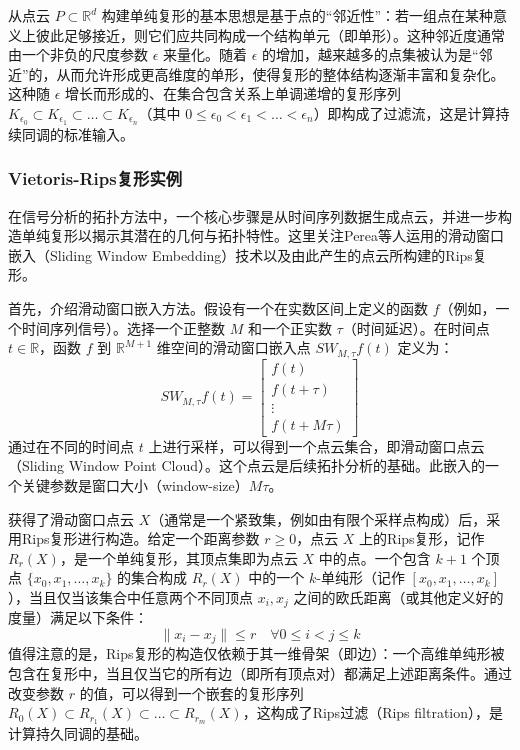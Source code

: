 从点云 $P \subset \mathbb{R}^d$ 构建单纯复形的基本思想是基于点的“邻近性”：若一组点在某种意义上彼此足够接近，则它们应共同构成一个结构单元（即单形）。这种邻近度通常由一个非负的尺度参数 $\epsilon$ 来量化。随着 $\epsilon$ 的增加，越来越多的点集被认为是“邻近”的，从而允许形成更高维度的单形，使得复形的整体结构逐渐丰富和复杂化。这种随 $\epsilon$ 增长而形成的、在集合包含关系上单调递增的复形序列 $K_{\epsilon_0} \subset K_{\epsilon_1} \subset \dots \subset K_{\epsilon_n}$（其中 $0 \le \epsilon_0 < \epsilon_1 < \dots < \epsilon_n$）即构成了过滤流，这是计算持续同调的标准输入。

\subsubsection{Vietoris-Rips复形实例}
在信号分析的拓扑方法中，一个核心步骤是从时间序列数据生成点云，并进一步构造单纯复形以揭示其潜在的几何与拓扑特性。这里关注Perea等人\cite{perea2015sliding}运用的滑动窗口嵌入（Sliding Window Embedding）技术以及由此产生的点云所构建的Rips复形。

首先，介绍滑动窗口嵌入方法。假设有一个在实数区间上定义的函数 $f$（例如，一个时间序列信号）。选择一个正整数 $M$ 和一个正实数 $\tau$（时间延迟）。在时间点 $t \in \mathbb{R}$，函数 $f$ 到 $\mathbb{R}^{M+1}$ 维空间的滑动窗口嵌入点 $SW_{M,\tau}f(t)$ 定义为：
\begin{equation}
    SW_{M,\tau}f(t) = \begin{bmatrix} f(t) \\ f(t+\tau) \\ \vdots \\ f(t+M\tau) \end{bmatrix}
\end{equation}
通过在不同的时间点 $t$ 上进行采样，可以得到一个点云集合，即滑动窗口点云（Sliding Window Point Cloud）。这个点云是后续拓扑分析的基础。此嵌入的一个关键参数是窗口大小（window-size）$M\tau$。

获得了滑动窗口点云 $X$（通常是一个紧致集，例如由有限个采样点构成）后，采用Rips复形进行构造。给定一个距离参数 $r \ge 0$，点云 $X$ 上的Rips复形，记作 $R_r(X)$，是一个单纯复形，其顶点集即为点云 $X$ 中的点。一个包含 $k+1$ 个顶点 $\{x_0, x_1, \ldots, x_k\}$ 的集合构成 $R_r(X)$ 中的一个 $k$-单纯形（记作 $[x_0, x_1, \ldots, x_k]$），当且仅当该集合中任意两个不同顶点 $x_i, x_j$ 之间的欧氏距离（或其他定义好的度量）满足以下条件：
\begin{equation}
    \|x_i - x_j\| \leq r \quad \forall 0 \leq i < j \leq k
\end{equation}
值得注意的是，Rips复形的构造仅依赖于其一维骨架（即边）：一个高维单纯形被包含在复形中，当且仅当它的所有边（即所有顶点对）都满足上述距离条件。通过改变参数 $r$ 的值，可以得到一个嵌套的复形序列 $R_0(X) \subset R_{r_1}(X) \subset \ldots \subset R_{r_m}(X)$，这构成了Rips过滤（Rips filtration），是计算持久同调的基础。

